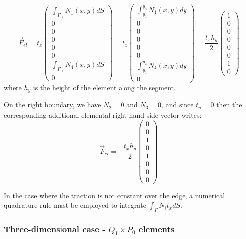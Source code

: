 \[
\vec{F}_{el}=
t_x
\left(
\begin{array}{c}
\int_{\Gamma_{14}}  N_1(x,y)  dS\\
0 \\
0 \\ 0 \\ 0 \\ 0 \\
\int_{\Gamma_{14}} N_4(x,y)  dS\\
0
\end{array}
\right)
=
t_x
\left(
\begin{array}{c}
\int_{y_1}^{y_4} N_1(x,y) dy\\
0 \\
0 \\ 0 \\ 0 \\ 0 \\
\int_{y_1}^{y_4} N_4(x,y) dy\\
0
\end{array}
\right)
=
\frac{t_x h_y}{2}
\left(
\begin{array}{c}
1 \\
0 \\
0 \\ 0 \\ 0 \\ 0 \\
1 \\
0
\end{array}
\right)
\]
where $h_y$ is the height of the element along the segment. 



On the right boundary, we have $N_2=0$ and $N_3=0$, and since $t_y=0$ then 
the corresponding additional elemental right hand side vector writes:
\[
\vec{F}_{el} =
-\frac{t_x h_y}{2}
\left(
\begin{array}{c}
0\\
0\\
1 \\
0\\
1 \\
0\\
0\\
0
\end{array}
\right)
\] 

In the case where the traction is not constant over the edge, a numerical quadrature rule 
must be employed to integrate $\int_\Gamma N_i t_x dS$.



\subsubsection{Three-dimensional case - $Q_1 \times P_0$ elements}

